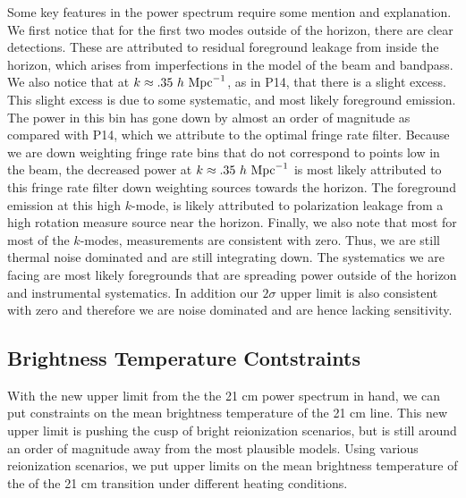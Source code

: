 \documentclass[twocolumn,numberedappendix]{emulateapj} \shorttitle{PSA64}
\begin{document}
Some key features in the power spectrum require some mention and explanation. We
first notice that for the first two modes outside of the horizon, there are
clear detections. These are attributed to residual foreground leakage from
inside the horizon, which arises from imperfections in the model of the beam and
bandpass. We also notice that at $k\approx{.35}\ h\ {\rm Mpc}^{-1}$, as in P14,
that there is a slight excess. This slight excess is
due to some systematic, and most likely foreground emission. The power in this
bin has gone down by almost an order of magnitude as compared with P14,
which we attribute to the optimal fringe rate filter.
Because we are down weighting fringe rate bins that do not correspond to points
low in the beam, the decreased power at $k\approx{.35}\ h\ {\rm Mpc}^{-1}$ is
most likely attributed to this fringe rate filter down weighting sources towards
the horizon. The foreground emission at this high $k$-mode, is likely attributed
to polarization leakage from a high rotation measure source near the horizon.
Finally, we also note that most for most of the $k$-modes, measurements are
consistent with zero. Thus, we are still thermal noise dominated and are still
integrating down. The systematics we are facing are most likely foregrounds that
are spreading power outside of the horizon and instrumental systematics. In
addition our $2\sigma$ upper limit is also consistent with zero and therefore we
are noise dominated and are hence lacking sensitivity.

\subsection{Brightness Temperature Contstraints}
With the new upper limit from the the 21 cm power spectrum in hand, we can put
constraints on the mean brightness temperature of the 21 cm line. This new
upper limit is pushing the cusp of bright reionization scenarios, but is still
around an order of magnitude away from the most plausible models. Using various
reionization scenarios, we put upper limits on the mean brightness
temperature of the of the 21 cm transition under different heating conditions.
\end{document}
